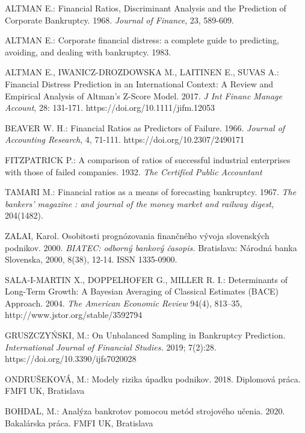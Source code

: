 \begin{thebibliography}{99}

     ALTMAN E.: Financial Ratios, Discriminant Analysis and the Prediction of Corporate Bankruptcy. 1968. \emph{Journal of Finance}, 23, 589-609. 

     ALTMAN E.: Corporate financial distress: a complete guide to predicting, avoiding, and dealing with bankruptcy. 1983.

     ALTMAN E., IWANICZ-DROZDOWSKA M., LAITINEN E., SUVAS A.:
    Financial Distress Prediction in an International Context: A Review and Empirical Analysis of Altman's Z-Score Model. 2017.
    \emph{J Int Financ Manage Account}, 28: 131-171. https://doi.org/10.1111/jifm.12053

     BEAVER W. H.: Financial Ratios as Predictors of Failure. 1966. \emph{Journal of Accounting Research}, 4, 71-111. https://doi.org/10.2307/2490171

     FITZPATRICK P.: A comparison of ratios of successful industrial enterprises with those of failed companies. 1932.
    \emph{The Certifíed Public Accountant}

     TAMARI M.: Financial ratios as a means of forecasting bankruptcy. 1967.
    \emph{The bankers' magazine : and journal of the money market and railway digest}, 204(1482).

     ZALAI, Karol. Osobitosti prognózovania finančného vývoja slovenských podnikov. 2000.
    \emph{BIATEC: odborný bankový časopis.} Bratislava: Národná banka Slovenska, 2000, 8(38), 12-14. ISSN 1335-0900.

     SALA-I-MARTIN X., DOPPELHOFER G., MILLER R. I.: Determinants of Long-Term Growth: A Bayesian Averaging of Classical Estimates (BACE) Approach. 2004.
    \emph{The American Economic Review} 94(4), 813–35, http://www.jstor.org/stable/3592794

     GRUSZCZYŃSKI, M.: On Unbalanced Sampling in Bankruptcy Prediction. \emph{International Journal of Financial Studies.} 2019; 7(2):28. https://doi.org/10.3390/ijfs7020028

     ONDRUŠEKOVÁ, M.: Modely rizika úpadku podnikov. 2018. Diplomová práca. FMFI UK, Bratislava
    
     BOHDAL, M.: Analýza bankrotov pomocou metód strojového učenia. 2020. Bakalárska práca. FMFI UK, Bratislava


\end{thebibliography}
